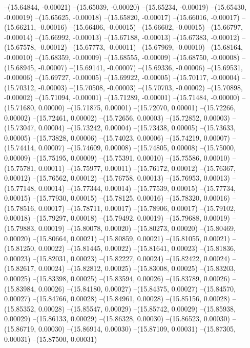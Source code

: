 --(15.64844, -0.00021)
--(15.65039, -0.00020)
--(15.65234, -0.00019)
--(15.65430, -0.00019)
--(15.65625, -0.00018)
--(15.65820, -0.00017)
--(15.66016, -0.00017)
--(15.66211, -0.00016)
--(15.66406, -0.00015)
--(15.66602, -0.00015)
--(15.66797, -0.00014)
--(15.66992, -0.00013)
--(15.67188, -0.00013)
--(15.67383, -0.00012)
--(15.67578, -0.00012)
--(15.67773, -0.00011)
--(15.67969, -0.00010)
--(15.68164, -0.00010)
--(15.68359, -0.00009)
--(15.68555, -0.00009)
--(15.68750, -0.00008)
--(15.68945, -0.00007)
--(15.69141, -0.00007)
--(15.69336, -0.00006)
--(15.69531, -0.00006)
--(15.69727, -0.00005)
--(15.69922, -0.00005)
--(15.70117, -0.00004)
--(15.70312, -0.00003)
--(15.70508, -0.00003)
--(15.70703, -0.00002)
--(15.70898, -0.00002)
--(15.71094, -0.00001)
--(15.71289, -0.00001)
--(15.71484, -0.00000)
--(15.71680, 0.00000)
--(15.71875, 0.00001)
--(15.72070, 0.00001)
--(15.72266, 0.00002)
--(15.72461, 0.00002)
--(15.72656, 0.00003)
--(15.72852, 0.00003)
--(15.73047, 0.00004)
--(15.73242, 0.00004)
--(15.73438, 0.00005)
--(15.73633, 0.00005)
--(15.73828, 0.00006)
--(15.74023, 0.00006)
--(15.74219, 0.00007)
--(15.74414, 0.00007)
--(15.74609, 0.00008)
--(15.74805, 0.00008)
--(15.75000, 0.00009)
--(15.75195, 0.00009)
--(15.75391, 0.00010)
--(15.75586, 0.00010)
--(15.75781, 0.00011)
--(15.75977, 0.00011)
--(15.76172, 0.00012)
--(15.76367, 0.00012)
--(15.76562, 0.00012)
--(15.76758, 0.00013)
--(15.76953, 0.00013)
--(15.77148, 0.00014)
--(15.77344, 0.00014)
--(15.77539, 0.00015)
--(15.77734, 0.00015)
--(15.77930, 0.00015)
--(15.78125, 0.00016)
--(15.78320, 0.00016)
--(15.78516, 0.00017)
--(15.78711, 0.00017)
--(15.78906, 0.00017)
--(15.79102, 0.00018)
--(15.79297, 0.00018)
--(15.79492, 0.00019)
--(15.79688, 0.00019)
--(15.79883, 0.00019)
--(15.80078, 0.00020)
--(15.80273, 0.00020)
--(15.80469, 0.00020)
--(15.80664, 0.00021)
--(15.80859, 0.00021)
--(15.81055, 0.00021)
--(15.81250, 0.00022)
--(15.81445, 0.00022)
--(15.81641, 0.00023)
--(15.81836, 0.00023)
--(15.82031, 0.00023)
--(15.82227, 0.00024)
--(15.82422, 0.00024)
--(15.82617, 0.00024)
--(15.82812, 0.00025)
--(15.83008, 0.00025)
--(15.83203, 0.00025)
--(15.83398, 0.00025)
--(15.83594, 0.00026)
--(15.83789, 0.00026)
--(15.83984, 0.00026)
--(15.84180, 0.00027)
--(15.84375, 0.00027)
--(15.84570, 0.00027)
--(15.84766, 0.00028)
--(15.84961, 0.00028)
--(15.85156, 0.00028)
--(15.85352, 0.00028)
--(15.85547, 0.00029)
--(15.85742, 0.00029)
--(15.85938, 0.00029)
--(15.86133, 0.00029)
--(15.86328, 0.00030)
--(15.86523, 0.00030)
--(15.86719, 0.00030)
--(15.86914, 0.00030)
--(15.87109, 0.00031)
--(15.87305, 0.00031)
--(15.87500, 0.00031)
